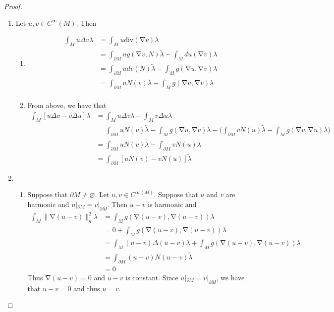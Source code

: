 \documentclass{book}
\theoremstyle{definition}
\newcommand{\lam}{\lambda}
\newcommand{\Del}{\Delta}
\DeclareMathOperator{\nab}{\nabla}
\DeclareMathOperator*{\0}{\mbf{0}}
\DeclareMathOperator*{\1}{\mbf{1}}
\renewcommand{\div}{\text{div}}
\newcommand{\p}{\partial}
\begin{document}
\begin{proof}\
	\begin{enumerate}
		\item Let $u,v \in C^{\infty}(M)$. Then
		\begin{enumerate}
			\item 
			\begin{align*}
				\int_{M} u \Del v \lam 
				& = \int_M u \div (\nab v ) \lam \\
				& = \int_{\p M} u g(\nab v, N) \tilde{\lam}  - \int_M du( \nab v) \lam \\
				& =  \int_{\p M} u dv(N) \tilde{\lam} -  \int_M g(\nab u, \nab v) \lam \\
				& = \int_{\p M} u N(v)  \tilde{\lam}  -  \int_M g(\nab u, \nab v) \lam \\
			\end{align*} 
			\item From above, we have that
			\begin{align*}
				\int_{M} [u \Del v - v \Del u] \lam
				& = \int_{M} u \Del v \lam - \int_{M} v \Del u \lam \\
				& = \int_{\p M} u N(v) \tilde{\lam}   -  \int_M g(\nab u, \nab v) \lam - \bigg (\int_{\p M} v N(u) \tilde{\lam}  -  \int_M g(\nab v, \nab u) \lam \bigg) \\
				& = \int_{\p M} u N(v) \tilde{\lam}  - \int_{\p M} v N(u) \tilde{\lam} \\
				& = \int_{\p M} [u N(v) - v N(u)] \tilde{\lam} 
			\end{align*}
		\end{enumerate}
		\item 
		\begin{enumerate}
			\item Suppose that $\p M \neq \varnothing$. Let $u,v \in C^{\infty(M)}$. Suppose that $u$ and $v$ are harmonic and $u|_{\p M} = v|_{\p M}$. Then $u-v$ is harmonic and 
			\begin{align*}
				\int_M \|\nab (u-v)\|_g^2 \lam 
				& = \int_M g(\nab (u-v), \nab(u-v)) \lam \\
				& = 0 + \int_M g(\nab (u-v), \nab(u-v)) \lam \\
				& = \int_{M} (u-v) \Del (u-v) \lam + \int_M g(\nab (u-v), \nab(u-v)) \lam \\
				& = \int_{\p M} (u-v) N(u-v) \tilde{\lam} \\
				& = 0
			\end{align*} 
			Thus $\nab (u-v) = 0$ and $u - v$ is constant. Since $u|_{\p M} = v|_{\p M}$, we have that $u - v = 0$ and thus $u = v$.

\end{enumerate}
\end{enumerate}
\end{proof}
\end{document}
